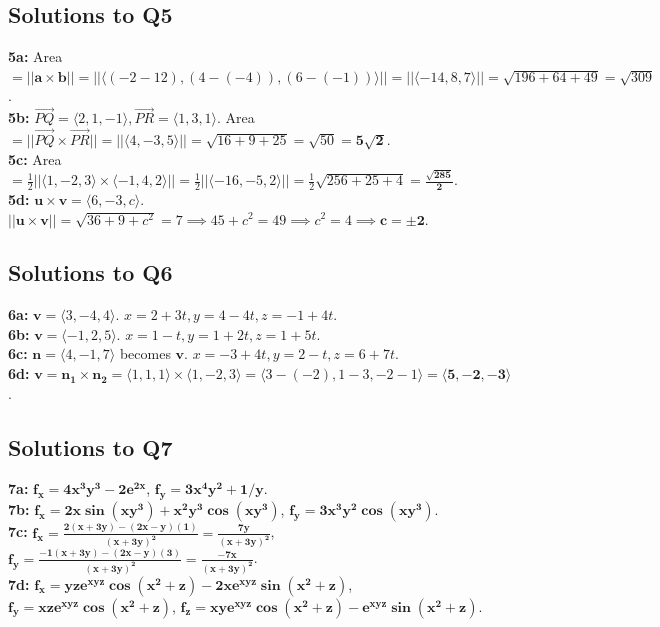 \documentclass[11pt]{article}
\begin{document}
\subsection{Solutions to Q5}
\textbf{5a:} Area $= ||\mathbf{a} \times \mathbf{b}|| = || \langle (-2-12), (4 - (-4)), (6 - (-1)) \rangle || = || \langle -14, 8, 7 \rangle || = \sqrt{196+64+49} = \sqrt{309}$.\\
\textbf{5b:} $\vec{PQ} = \langle 2, 1, -1 \rangle, \vec{PR} = \langle 1, 3, 1 \rangle$. Area $= ||\vec{PQ} \times \vec{PR}|| = ||\langle 4, -3, 5 \rangle|| = \sqrt{16+9+25} = \sqrt{50} = \mathbf{5\sqrt{2}}$.\\
\textbf{5c:} Area $= \frac{1}{2} || \langle 1, -2, 3 \rangle \times \langle -1, 4, 2 \rangle || = \frac{1}{2} || \langle -16, -5, 2 \rangle || = \frac{1}{2}\sqrt{256+25+4} = \mathbf{\frac{\sqrt{285}}{2}}$.\\
\textbf{5d:} $\mathbf{u} \times \mathbf{v} = \langle 6, -3, c \rangle$. $||\mathbf{u} \times \mathbf{v}|| = \sqrt{36+9+c^2} = 7 \implies 45+c^2 = 49 \implies c^2 = 4 \implies \mathbf{c = \pm 2}$.

\subsection{Solutions to Q6}
\textbf{6a:} $\mathbf{v} = \langle 3, -4, 4 \rangle$. \textbf{$x = 2+3t, y = 4-4t, z = -1+4t$}.\\
\textbf{6b:} $\mathbf{v} = \langle -1, 2, 5 \rangle$. \textbf{$x = 1-t, y = 1+2t, z = 1+5t$}.\\
\textbf{6c:} $\mathbf{n} = \langle 4, -1, 7 \rangle$ becomes $\mathbf{v}$. \textbf{$x = -3+4t, y = 2-t, z = 6+7t$}.\\
\textbf{6d:} $\mathbf{v} = \mathbf{n_1} \times \mathbf{n_2} = \langle 1,1,1 \rangle \times \langle 1,-2,3 \rangle = \langle 3-(-2), 1-3, -2-1 \rangle = \mathbf{\langle 5, -2, -3 \rangle}$.

\subsection{Solutions to Q7}
\textbf{7a:} $\mathbf{f_x = 4x^3y^3 - 2e^{2x}}$, $\mathbf{f_y = 3x^4y^2 + 1/y}$.\\
\textbf{7b:} $\mathbf{f_x = 2x\sin(xy^3) + x^2y^3\cos(xy^3)}$, $\mathbf{f_y = 3x^3y^2\cos(xy^3)}$.\\
\textbf{7c:} $\mathbf{f_x = \frac{2(x+3y) - (2x-y)(1)}{(x+3y)^2} = \frac{7y}{(x+3y)^2}}$, $\mathbf{f_y = \frac{-1(x+3y) - (2x-y)(3)}{(x+3y)^2} = \frac{-7x}{(x+3y)^2}}$.\\
\textbf{7d:} $\mathbf{f_x = yz e^{xyz}\cos(x^2+z) - 2x e^{xyz}\sin(x^2+z)}$, $\mathbf{f_y = xz e^{xyz}\cos(x^2+z)}$, $\mathbf{f_z = xy e^{xyz}\cos(x^2+z) - e^{xyz}\sin(x^2+z)}$.
\end{document}
